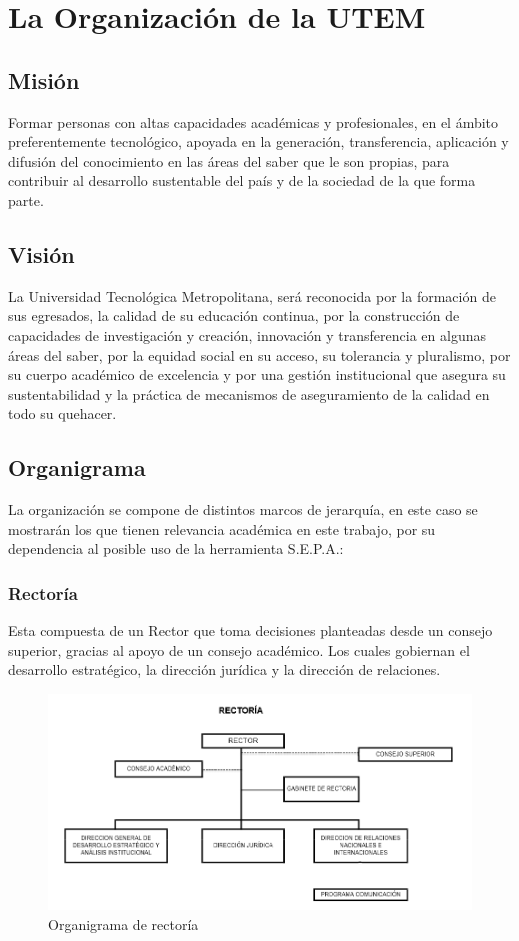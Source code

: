 \documentclass[a4paper,12pt,openany,oneside]{book}
\begin{document}
\chapter{La Organización de la UTEM}
\thispagestyle{empty}
\section{Misión}
Formar personas con altas capacidades académicas y profesionales, en el ámbito preferentemente tecnológico, apoyada en la generación, transferencia, aplicación y difusión del conocimiento en las áreas del saber que le son propias, para contribuir al desarrollo sustentable del país y de la sociedad de la que forma parte.
\section{Visión}
La Universidad Tecnológica Metropolitana, será reconocida por la formación de sus egresados, la calidad de su educación continua, por la construcción de capacidades de investigación y creación, innovación y transferencia en algunas áreas del saber, por la equidad social en su acceso, su tolerancia y pluralismo, por su cuerpo académico de excelencia y por una gestión institucional que asegura su sustentabilidad y la práctica de mecanismos de aseguramiento de la calidad en todo su quehacer.
\section{Organigrama}
La organización se compone de distintos marcos de jerarquía, en este caso se mostrarán los que tienen relevancia académica en este trabajo, por su dependencia al posible uso de la herramienta S.E.P.A.:
\subsection{Rectoría}
Esta compuesta de un Rector que toma decisiones planteadas desde un consejo superior, gracias al apoyo de un consejo académico. Los cuales gobiernan el desarrollo estratégico, la dirección jurídica y la dirección de relaciones.
\begin{figure}[!hbp]
\begin{center}
\includegraphics[scale=0.6,angle=0]{images/organigrama/1.png}
\caption{Organigrama de rector\'ia}
\label{Organigrama de rectoria}
\end{center}
\end{figure}
\end{document}
